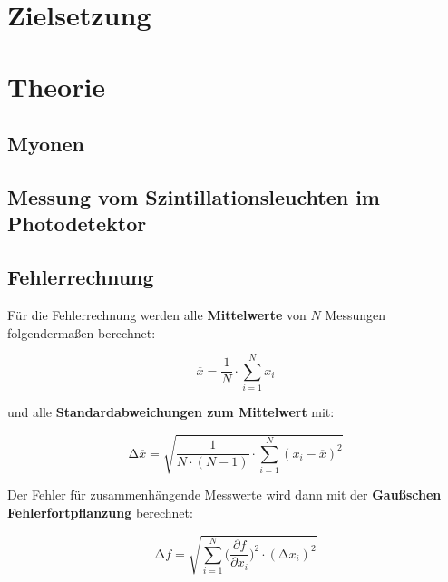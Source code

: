 \section{Zielsetzung}


\section{Theorie}
\subsection{Myonen}

\subsection{Messung vom Szintillationsleuchten im Photodetektor}


\subsection{Fehlerrechnung}
Für die Fehlerrechnung werden alle \textbf{Mittelwerte} von $N$ Messungen folgendermaßen berechnet:

\begin{equation}
    \overline{x} = \frac{1}{N} \cdot \sum_{i=1}^N x_i
    \label{eqn:Mittelwert}
\end{equation}

und alle \textbf{Standardabweichungen zum Mittelwert} mit:

\begin{equation}
    \increment\overline{x} = \sqrt{\frac{1}{N\cdot(N-1)}\cdot\sum_{i=1}^N (x_i-\overline{x})^2}
    \label{eqn:St_Mittelwert}
\end{equation}

Der Fehler für zusammenhängende Messwerte wird dann mit der \textbf{Gaußschen Fehlerfortpflanzung} berechnet:

\begin{equation}
    \increment{f} = \sqrt{ \sum_{i = 1}^{N}  \biggl(\frac{\partial{f}}{\partial{x_i}}\biggr)^2\cdot(\increment{x_i})^2}
    \label{eqn:Gauss}
\end{equation}

